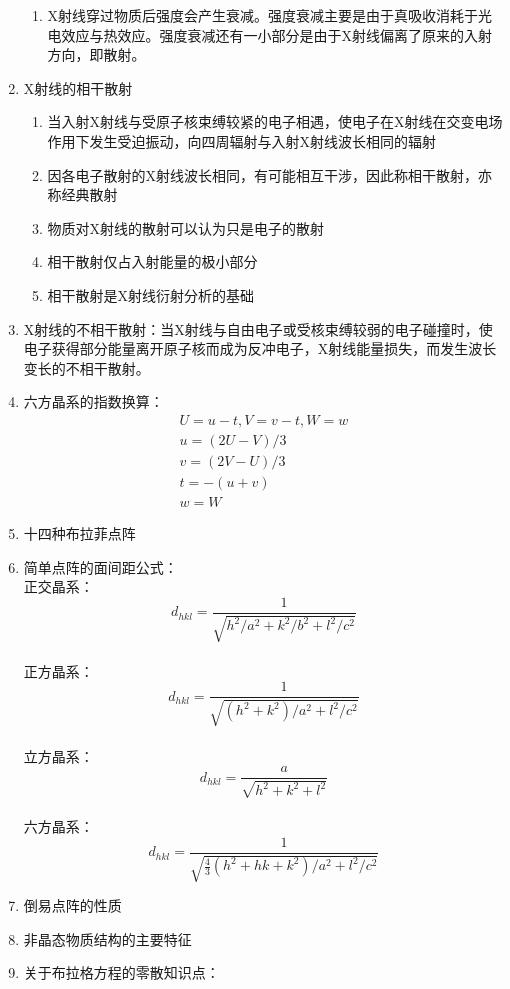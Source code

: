 \documentclass[12pt,a4paper]{article}
\begin{document}
\begin{enumerate}
\begin{enumerate}
            \item X射线穿过物质后强度会产生衰减。强度衰减主要是由于真吸收消耗于光电效应与热效应。强度衰减还有一小部分是由于X射线偏离了原来的入射方向，即散射。
        \end{enumerate}
        \item X射线的相干散射
        \begin{enumerate}
            \item 当入射X射线与受原子核束缚较紧的电子相遇，使电子在X射线在交变电场作用下发生受迫振动，向四周辐射与入射X射线波长相同的辐射
            \item 因各电子散射的X射线波长相同，有可能相互干涉，因此称相干散射，亦称经典散射
            \item 物质对X射线的散射可以认为只是电子的散射
            \item 相干散射仅占入射能量的极小部分
            \item 相干散射是X射线衍射分析的基础
        \end{enumerate}
        \item X射线的不相干散射：当X射线与自由电子或受核束缚较弱的电子碰撞时，使电子获得部分能量离开原子核而成为反冲电子，X射线能量损失，而发生波长变长的不相干散射。
        \item 六方晶系的指数换算：$$\begin{array}{c}{U=u-t, V=v-t, W=w} \\ {u=(2 U-V) / 3} \\ {v=(2 V-U) / 3} \\ {t=-(u+v)} \\ {w=W}\end{array}$$
        \item 十四种布拉菲点阵
        \item 简单点阵的面间距公式：
        \\正交晶系：$$d_{h k l}=\frac{1}{\sqrt{h^{2} / a^{2}+k^{2} / b^{2}+l^{2} / c^{2}}}$$
        \\正方晶系：$$d_{h k l}=\frac{1}{\sqrt{\left(h^{2}+k^{2}\right) / a^{2}+l^{2} / c^{2}}}$$
        \\立方晶系：$$d_{h k l}=\frac{a}{\sqrt{h^{2}+k^{2}+l^{2}}}$$
        \\六方晶系：$$d_{h k l}=\frac{1}{\sqrt{\frac{4}{3}\left(h^{2}+h k+k^{2}\right) / a^{2}+l^{2} / c^{2}}}$$
        \item 倒易点阵的性质
        \item 非晶态物质结构的主要特征
        \item 关于布拉格方程的零散知识点：
            \begin{enumerate}

\end{enumerate}
\end{enumerate}
\end{document}
